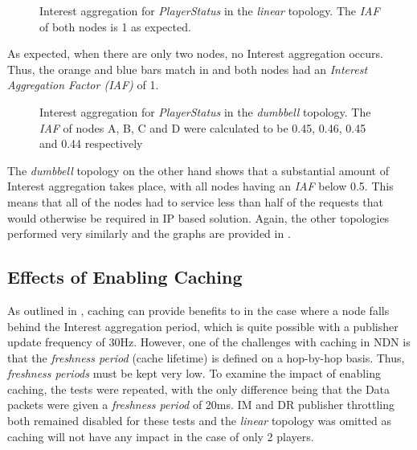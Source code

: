 \begin{figure}[H]
    \centering
    \caption{Interest aggregation for \textit{PlayerStatus} in the \textit{linear} topology. The \textit{IAF} of both nodes is 1 as expected.}
    \label{fig:eval:basic:interest-agg-linear}
\end{figure}

As expected, when there are only two nodes, no Interest aggregation occurs. Thus, the orange and blue bars match in  and both nodes had an \textit{Interest Aggregation Factor (IAF)} of 1.

\begin{figure}[H]
    \centering
    \caption{Interest aggregation for \textit{PlayerStatus} in the \textit{dumbbell} topology. The \textit{IAF} of nodes A, B, C and D were calculated to be 0.45, 0.46, 0.45 and 0.44 respectively}
    \label{fig:eval:basic:interest-agg-dumbbell}
\end{figure}


The \textit{dumbbell} topology on the other hand shows that a substantial amount of Interest aggregation takes place, with all nodes having an \textit{IAF} below 0.5. This means that all of the nodes had to service less than half of the requests that would otherwise be required in IP based solution. Again, the other topologies performed very similarly and the graphs are provided in .

\subsection{Effects of Enabling Caching}
As outlined in , caching can provide benefits to \game{} in the case where a node falls behind the Interest aggregation period, which is quite possible with a publisher update frequency of 30Hz. However, one of the challenges with caching in NDN is that the \textit{freshness period} (cache lifetime) is defined on a hop-by-hop basis. Thus, \textit{freshness periods} must be kept very low. To examine the impact of enabling caching, the tests were repeated, with the only difference being that the Data packets were given a \textit{freshness period} of 20ms. IM and DR publisher throttling both remained disabled for these tests and the \textit{linear} topology was omitted as caching will not have any impact in the case of only 2 players.

